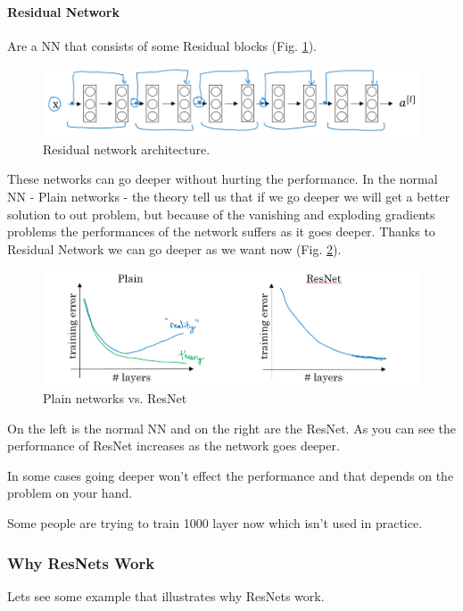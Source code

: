 \paragraph{Residual Network}
Are a NN that consists of some Residual blocks (Fig. \ref{resnet}).

\begin{figure}[!htbp]
    \centering
    \includegraphics[width=1.0\textwidth]{img/c4/resnet.png}
    \caption{Residual network architecture.}
    \label{resnet}
\end{figure}

These networks can go deeper without hurting the performance. In the normal NN - Plain networks - the theory tell us that if we go deeper we will get a better solution to out problem, but because of the vanishing and exploding gradients problems the performances of the network suffers as it goes deeper. Thanks to Residual Network we can go deeper as we want now (Fig. \ref{plain-vs-resnet}).

\begin{figure}[!htbp]
    \centering
    \includegraphics[width=1.0\textwidth]{img/c4/plain-vs-resnet.png}
    \caption{Plain networks vs. ResNet}
    \label{plain-vs-resnet}
\end{figure}

On the left is the normal NN and on the right are the ResNet. As you can see the performance of ResNet increases as the network goes deeper.

In some cases going deeper won't effect the performance and that depends on the problem on your hand.

Some people are trying to train 1000 layer now which isn't used in practice.

\subsubsection{Why ResNets Work}
Lets see some example that illustrates why ResNets work.

